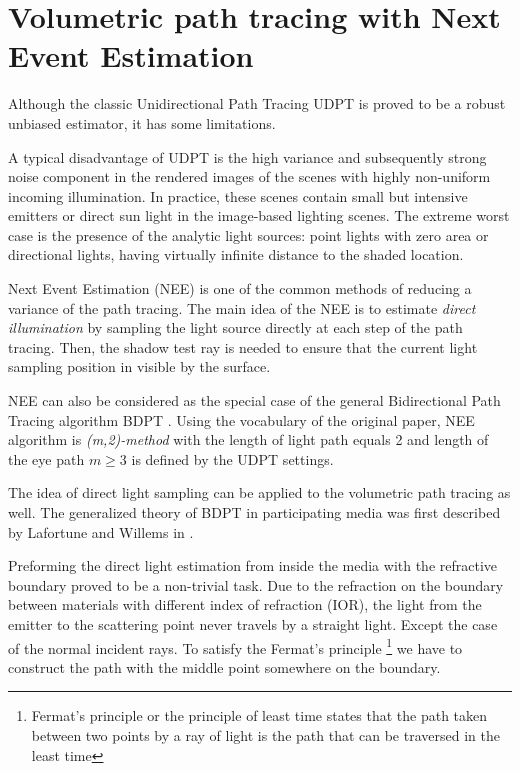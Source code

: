 \section{Volumetric path tracing with Next Event Estimation}
\label{section:udpt}
Although the classic Unidirectional Path Tracing \gls{UDPT} is proved to be a robust unbiased
estimator, it has some limitations.

A typical disadvantage of \gls{UDPT} is the high variance and subsequently strong noise component in
the rendered images of the scenes with highly non-uniform incoming illumination.
In practice, these scenes contain small but intensive emitters or direct sun light in the
image-based lighting scenes. The extreme worst case is the presence of the analytic light sources:
point lights with zero area or directional lights, having virtually infinite distance to the shaded
location.

Next Event Estimation (\gls{NEE}) is one of the common methods of reducing a variance of the path
tracing. The main idea of the \gls{NEE} is to estimate \textit{direct illumination} by sampling the
light source directly at each step of the path tracing. Then, the shadow test ray is needed to
ensure that the current light sampling position in visible by the surface.

\gls{NEE} can also be considered as the special case of the general Bidirectional Path Tracing
algorithm \gls{BDPT} \cite{Veach:94:BDPT}.
Using the vocabulary of the original paper, NEE algorithm is \textit{(m,2)-method} with the length
of light path equals 2 and length of the eye path $m\geq3$ is defined by the \gls{UDPT} settings.

The idea of direct light sampling can be applied to the volumetric path tracing as well.
The generalized theory of \gls{BDPT} in participating media was first described by Lafortune and
Willems in \cite{Lafortune:1996:RPM:275458.275468}.

Preforming the direct light estimation from inside the media with the refractive boundary proved to
be a non-trivial task. Due to the refraction on the boundary between materials with different index
of refraction (\gls{IOR}), the light from the emitter to the scattering point never travels by a
straight light.
Except the case of the normal incident rays. To satisfy the Fermat's principle \footnote{Fermat's
principle or the principle of least time states that the path taken between two points by a ray of
light is the path that can be traversed in the least time} we have to construct the path with the
middle point somewhere on the boundary.


